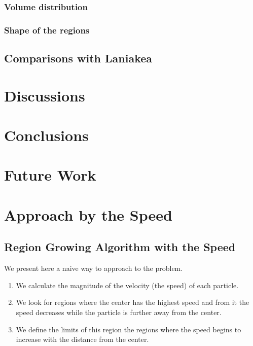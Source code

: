 \documentclass[12pt]{article}
\begin{document}
\subsubsection{Volume distribution}

\subsubsection{Shape of the regions}

\subsection{Comparisons with Laniakea}

\section{Discussions}

\section{Conclusions}

\section{Future Work}







\appendix
\section{Approach by the Speed} \label{App:App_Speed}
\subsection{Region Growing Algorithm with the Speed}

We present here a naive way to approach to the problem. 
\begin{enumerate}
	\item We calculate the magnitude of the velocity (the speed) of each particle. 
	\item We look for regions where the center has the highest speed and from it the speed decreases while the particle is further away from the center. 
    \item We define the limits of this region the regions where the speed begins to increase with the distance from the center.
\end{enumerate}
\end{document}
